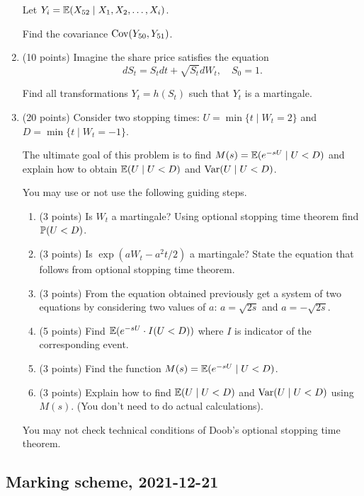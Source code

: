 \documentclass[12pt, a4paper]{article}
\begin{document}
\begin{enumerate}
  Let $Y_i = \E(X_{52} \mid X_1, X_2, \ldots, X_i)$.

  Find the covariance $\Cov(Y_{50}, Y_{51})$.

  \item (10 points) Imagine the share price satisfies the equation 
  \[
  dS_t = S_t dt + \sqrt{S_t} dW_t, \quad S_0 = 1. 
  \]

  Find all transformations $Y_t = h(S_t)$ such that $Y_t$ is a martingale. 

  \item (20 points) Consider two stopping times: $U = \min \{ t \mid W_t = 2 \}$ and $D = \min \{t \mid W_t = -1\}$. 
  
  The ultimate goal of this problem is to find $M(s) = \E(e^{-s U} \mid U < D)$
  and explain how to obtain $\E(U \mid U<D)$ and $\Var(U \mid U<D)$. 

  You may use or not use the following guiding steps. 
  \begin{enumerate}
      \item (3 points) Is $W_t$ a martingale? Using optional stopping time theorem find $\P(U < D)$.
      \item (3 points) Is $\exp(a W_t - a^2 t/2)$ a martingale? State the equation that follows from optional stopping time theorem. 
      \item (3 points) From the equation obtained previously get a system of two equations by considering two values of $a$: 
      $a=\sqrt{2s}$ and $a=-\sqrt{2s}$.
      \item (5 points) Find $\E(e^{-sU} \cdot I(U < D))$ where $I$ is indicator of the corresponding event. 
      \item (3 points) Find the function $M(s) = \E(e^{-s U} \mid U < D)$.
      \item (3 points) Explain how to find $\E(U \mid U < D)$ and $\Var(U \mid U < D)$ using $M(s)$. 
      (You don't need to do actual calculations).
  \end{enumerate}

  You may not check technical conditions of Doob's optional stopping time theorem.
  
\end{enumerate}


\subsection{Marking scheme, 2021-12-21}
\end{document}
